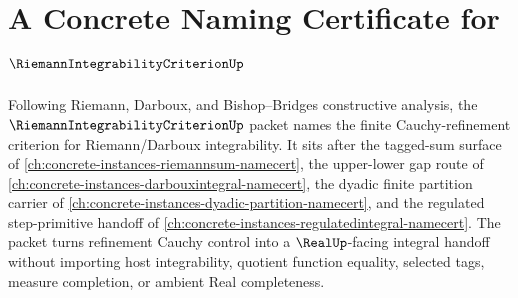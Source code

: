 \chapter{A Concrete Naming Certificate for $\RiemannIntegrabilityCriterionUp$}
\label{ch:concrete-instances-riemann-integrability-criterion-namecert}

Following Riemann, Darboux, and Bishop--Bridges constructive analysis, the $\RiemannIntegrabilityCriterionUp$ packet names the finite Cauchy-refinement criterion for Riemann/Darboux integrability. It sits after the tagged-sum surface of \autoref{ch:concrete-instances-riemannsum-namecert}, the upper-lower gap route of \autoref{ch:concrete-instances-darbouxintegral-namecert}, the dyadic finite partition carrier of \autoref{ch:concrete-instances-dyadic-partition-namecert}, and the regulated step-primitive handoff of \autoref{ch:concrete-instances-regulatedintegral-namecert}. The packet turns refinement Cauchy control into a $\RealUp$-facing integral handoff without importing host integrability, quotient function equality, selected tags, measure completion, or ambient Real completeness.


